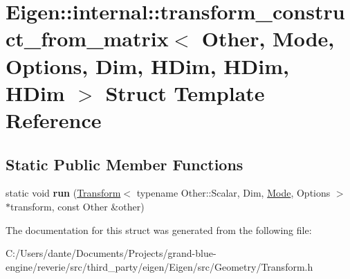 \hypertarget{struct_eigen_1_1internal_1_1transform__construct__from__matrix_3_01_other_00_01_mode_00_01_optioafd8e88ef382fcf70f7e3dd5fcd9f415}{}\section{Eigen\+::internal\+::transform\+\_\+construct\+\_\+from\+\_\+matrix$<$ Other, Mode, Options, Dim, H\+Dim, H\+Dim, H\+Dim $>$ Struct Template Reference}
\label{struct_eigen_1_1internal_1_1transform__construct__from__matrix_3_01_other_00_01_mode_00_01_optioafd8e88ef382fcf70f7e3dd5fcd9f415}
\subsection*{Static Public Member Functions}
\begin{DoxyCompactItemize}
\item 
\mbox{\label{struct_eigen_1_1internal_1_1transform__construct__from__matrix_3_01_other_00_01_mode_00_01_optioafd8e88ef382fcf70f7e3dd5fcd9f415_a48de7daffd0a823a050a8c3410624af7}} 
static void {\bfseries run} (\mbox{\hyperlink{class_eigen_1_1_transform}{Transform}}$<$ typename Other\+::\+Scalar, Dim, \mbox{\hyperlink{struct_mode}{Mode}}, Options $>$ $\ast$transform, const Other \&other)
\end{DoxyCompactItemize}


The documentation for this struct was generated from the following file\+:\begin{DoxyCompactItemize}
\item 
C\+:/\+Users/dante/\+Documents/\+Projects/grand-\/blue-\/engine/reverie/src/third\+\_\+party/eigen/\+Eigen/src/\+Geometry/Transform.\+h\end{DoxyCompactItemize}
